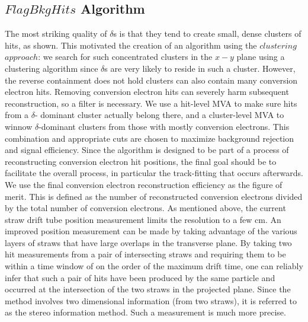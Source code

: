 \subsection{$FlagBkgHits$ Algorithm}
The most striking quality of $\delta$s is that they tend to create small, dense clusters of hits, as
shown. This motivated the creation of an algorithm using the $clustering$ $approach$: we search for such
concentrated clusters in the $x-y$ plane using a clustering algorithm since $\delta$s are very likely to reside
in such a cluster. However, the reverse containment does not hold clusters can also contain many
conversion electron hits. Removing conversion electron hits can severely harm subsequent
reconstruction, so a filter is necessary. We use a hit-level MVA to make sure hits from a $\delta$-
dominant cluster actually belong there, and a cluster-level MVA to winnow $\delta$-dominant clusters
from those with mostly conversion electrons. This combination and appropriate cuts are chosen to
maximize background rejection and signal efficiency.
Since the algorithm is designed to be part of a process of reconstructing conversion electron hit positions, the
final goal should be to facilitate the overall process, in particular the track-fitting that occurs
afterwards. We use the final conversion electron reconstruction efficiency as the figure of merit. This
is defined as the number of reconstructed conversion electrons divided by the total number of
conversion electrons.
As mentioned above, the current straw drift tube position measurement limits the resolution to a
few cm. An improved position measurement can be made by taking advantage of the various layers of
straws that have large overlaps in the transverse plane. By taking two hit measurements from a pair of
intersecting straws and requiring them to be within a time window of on the order of the maximum
drift time, one can reliably infer that such a pair of hits have been produced by the same particle and
occurred at the intersection of the two straws in the projected plane. Since the method involves two
dimensional information (from two straws), it is referred to as the stereo information method. Such a
measurement is much more precise. 




